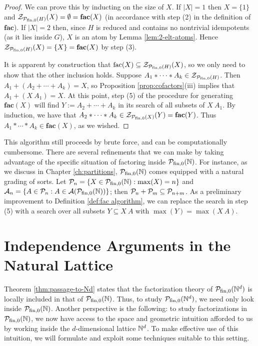 \begin{proof}
We can prove this by inducting on the size of $X$.
If $|X|=1$ then $X = \{1\}$ and $\Z_{\P_\fon(H)}(X) = \emptyset = \mathbf{fac}(X)$ (in accordance with step (2) in the definition of $\mathbf{fac}$).
If $|X| = 2$ then, since $H$ is reduced and contains no nontrivial idempotents (as it lies inside $G$), $X$ is an atom by Lemma \ref{lem:2-elt-atoms}.
Hence $\Z_{\P_\fon(H)}(X) = \{X\} = \mathbf{fac}(X)$ by step (3).

It is apparent by construction that $\operatorname{fac}(X) \subseteq \Z_{\P_\fon(H)}(X)$, so we only need to show that the other inclusion holds.
Suppose $A_1*\cdots*A_k \in \Z_{\P_\fon(H)}$.
Then $A_1 + (A_2 + \cdots + A_k) = X$, so Proposition \ref{prop:cofactors}(iii) implies that $A_1 + (X\:A_1) = X$.
At this point, step (5) of the procedure for generating $\mathbf{fac}(X)$ will find $Y:=A_2+\cdots+A_k$ in its search of all subsets of $X\:A_1$.
By induction, we have that $A_2*\cdots*A_k \in \Z_{\P_\fon(X)}(Y) = \mathbf{fac}(Y)$.
Thus $A_1 * \cdots * A_k \in \mathbf{fac}(X)$, as we wished.
\end{proof}

\begin{rk}
This algorithm still proceeds by brute force, and can be computationally cumbersome.  
There are several refinements that we can make by taking advantage of the specific situation of factoring inside $\PN$.
For instance, as we discuss in Chapter \ref{ch:partitions}, $\PN$ comes equipped with a natural grading of sorts.
Let $\P_n = \{X\in \PN: \max(X)=n\}$ and $\A_n = \{A\in \P_n: A\in \A(\PN)\}$; then $\P_n + \P_m \subseteq \P_{n+m}$.
As a preliminary improvement to Definition \ref{def:fac algorithm}, we can replace the search in step (5) with a search over all subsets $Y \subseteq X\:A$ with $\max(Y) = \max(X\:A)$.
\end{rk}



\section{Independence Arguments in the Natural Lattice}

Theorem \ref{thm:passage-to-Nd} states that the factorization theory of $\P_\fon(\NN^d)$ is locally included in that of $\PN$.
Thus, to study $\P_\fon(\NN^d)$, we need only look inside $\PN$. 
Another perspective is the following: to study factorizations in $\PN$, we now have access to the space and geometric intuition afforded to us by working inside the $d$-dimensional lattice $\NN^d$.
To make effective use of this intuition, we will formulate and exploit some techniques suitable to this setting.

